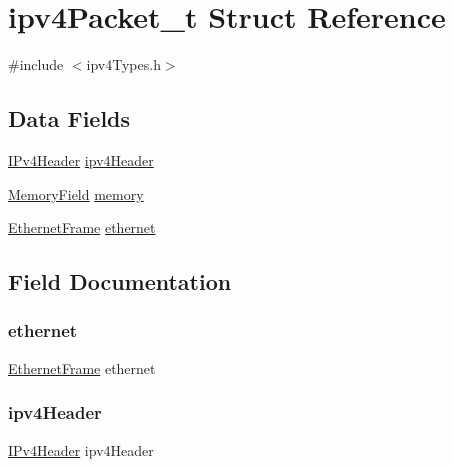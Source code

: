 \hypertarget{structipv4_packet__t}{}\section{ipv4\+Packet\+\_\+t Struct Reference}
\label{structipv4_packet__t}


{\ttfamily \#include $<$ipv4\+Types.\+h$>$}

\subsection*{Data Fields}
\begin{DoxyCompactItemize}
\item 
\mbox{\hyperlink{group__ipv4_ga34902217aba44467d57a03c25523d12a}{I\+Pv4\+Header}} \mbox{\hyperlink{structipv4_packet__t_ab51277a55b25e1951c2f8f7d876963e6}{ipv4\+Header}}
\item 
\mbox{\hyperlink{group__memory_gae2c54b1b1aca949825bf68fe618c8e97}{Memory\+Field}} \mbox{\hyperlink{structipv4_packet__t_a7dd6a3160ed58904a4699e281fc4617b}{memory}}
\item 
\mbox{\hyperlink{ethernet_types_8h_a4326bd21ae707ac8b03ec375370e3b5b}{Ethernet\+Frame}} \mbox{\hyperlink{structipv4_packet__t_aac5466b4a2ccecbe65f4a0b0d734ddb7}{ethernet}}
\end{DoxyCompactItemize}


\subsection{Field Documentation}
\mbox{\label{structipv4_packet__t_aac5466b4a2ccecbe65f4a0b0d734ddb7}} 
\subsubsection{\texorpdfstring{ethernet}{ethernet}}
{\footnotesize\ttfamily \mbox{\hyperlink{ethernet_types_8h_a4326bd21ae707ac8b03ec375370e3b5b}{Ethernet\+Frame}} ethernet}

\mbox{\label{structipv4_packet__t_ab51277a55b25e1951c2f8f7d876963e6}} 
\subsubsection{\texorpdfstring{ipv4Header}{ipv4Header}}
{\footnotesize\ttfamily \mbox{\hyperlink{group__ipv4_ga34902217aba44467d57a03c25523d12a}{I\+Pv4\+Header}} ipv4\+Header}

